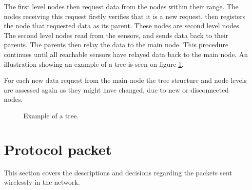 The first level nodes then request data from the nodes within their range. 
The nodes receiving this request firstly verifies that it is a new request, then registers the node that requested data as its parent. 
These nodes are second level nodes. The second level nodes read from the sensors, and sends data back to their parents. The parents then relay the data to the main node. 
This procedure continues until all reachable sensors have relayed data back to the main node.
An illustration showing an example of a tree is seen on figure \ref{fig:prottree1}.

For each new data request from the main node the tree structure and node levels are assessed again as they might have changed, due to new or disconnected nodes.

\begin{figure}[!h]
	\centering
	\caption{Example of a tree.}
	\label{fig:prottree1}
\end{figure}


\section{Protocol packet}
This section covers the descriptions and decisions regarding the packets sent wirelessly in the network.

